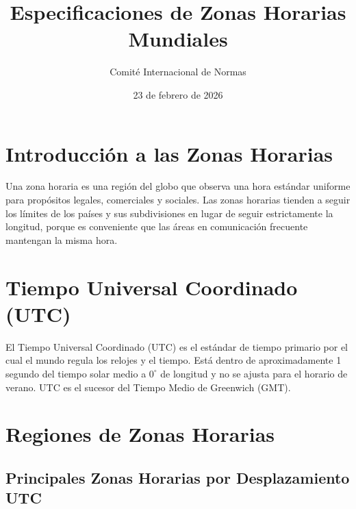 \documentclass[12pt]{article}
\title{Especificaciones de Zonas Horarias Mundiales}
\author{Comité Internacional de Normas}
\date{23 de febrero de 2026}
\begin{document}
\maketitle

\section{Introducción a las Zonas Horarias}

Una zona horaria es una región del globo que observa una hora estándar uniforme para propósitos legales, comerciales y sociales. Las zonas horarias tienden a seguir los límites de los países y sus subdivisiones en lugar de seguir estrictamente la longitud, porque es conveniente que las áreas en comunicación frecuente mantengan la misma hora.

\section{Tiempo Universal Coordinado (UTC)}

El Tiempo Universal Coordinado (UTC) es el estándar de tiempo primario por el cual el mundo regula los relojes y el tiempo. Está dentro de aproximadamente 1 segundo del tiempo solar medio a $0^{\circ}$ de longitud y no se ajusta para el horario de verano. UTC es el sucesor del Tiempo Medio de Greenwich (GMT).

\section{Regiones de Zonas Horarias}

\subsection{Principales Zonas Horarias por Desplazamiento UTC}
\end{document}
